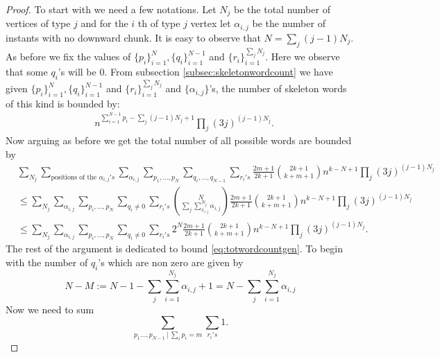 \documentclass[12pt]{article}
\numberwithin{equation}{section}
\numberwithin{equation}{section}
\theoremstyle{definition}
\renewcommand{\1}{\bf 1}
\begin{document}
\begin{proof}
To start with we need a few notations. Let $N_{j}$ be the total number of vertices of type $j$ and for the $i$ th of type $j$ vertex let $\alpha_{i,j}$ be the number of instants with no downward chunk. It is easy to observe that $N= \sum_{j} (j-1) N_{j}$. As before we fix the values of $\{p_{i}\}_{i=1}^{N}, \{ q_{i} \}_{i=1}^{N-1}$ and $\{ r_{i} \}_{i=1}^{\sum_{j}N_{j}}$. Here we observe that some $q_{i}$'s will be $0$. From subsection \ref{subsec:skeletonwordcount} we have given $\{p_{i}\}_{i=1}^{N},\{ q_{i} \}_{i=1}^{N-1}$ and $\{ r_{i} \}_{i=1}^{\sum_{j}N_{j}}$ and $\{ \alpha_{i,j} \}$'s, the number of skeleton words of this kind is bounded by:
\begin{equation}\label{eq:genskeletonwordcount}
\begin{split}
& n^{\sum_{i=1}^{N-1}p_{i} -\sum_{j}(j-1)N_{j} +1}\prod_{j} (3j)^{(j-1)N_{j}}.
\end{split}
\end{equation}  
Now arguing as before we get the total number of all possible words are bounded by 
\begin{equation}\label{eq:totwordcountgen}
\begin{split}
&\sum_{N_{j}}\sum_{\text{positions of the } \alpha_{i,j}'s}\sum_{\alpha_{i,j}}\sum_{p_{1},\ldots,p_{N}}\sum_{q_{i},\ldots,q_{N-1}}\sum_{r_{i}'s}  \frac{2m+1}{2k+1}\binom{2k+1}{k+m+1} n^{k-N+1}\prod_{j}\left(3j\right)^{(j-1)N_{j}}\\
&\le \sum_{N_{j}} \sum_{\alpha_{i,j}}\sum_{p_{i},\ldots,p_{N}}\sum_{q_{i} \neq 0}\sum_{r_{i}'s} \binom{N}{\sum_{j}\sum_{x_{i,j}}^{N_{j}}\alpha_{i,j}}\frac{2m+1}{2k+1}\binom{2k+1}{k+m+1} n^{k-N+1}\prod_{j}(3j)^{(j-1)N_{j}}\\
& \le \sum_{N_{j}}\sum_{\alpha_{i,j}}\sum_{p_{i},\ldots,p_{N}}\sum_{q_{i} \neq 0}\sum_{r_{i}'s} 2^{N}\frac{2m+1}{2k+1}\binom{2k+1}{k+m+1} n^{k-N+1}\prod_{j}(3j)^{(j-1)N_{j}}.
\end{split}
\end{equation}
The rest of the argument is dedicated to bound \eqref{eq:totwordcountgen}. To begin with the number of $q_{i}$'s which are non zero are given by 
\begin{equation}\label{eq:noqnonzero}
N-M:= N-1 - \sum_{j}\sum_{i=1}^{N_{j}} \alpha_{i,j} +1= N - \sum_{j}\sum_{i=1}^{N_{j}} \alpha_{i,j}
\end{equation} 
Now we need to sum 
\begin{equation}\label{eq:sumpsumr}
\sum_{p_{1}\ldots,p_{N-1}~|~ \sum_{i}p_{i}=m} \sum_{r_{i}'s}1.
\end{equation}

\end{proof}
\end{document}
